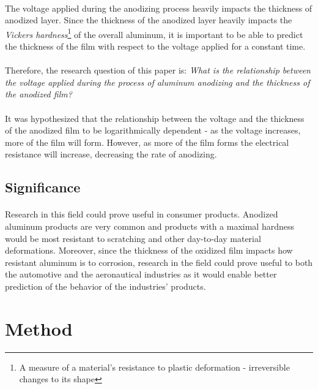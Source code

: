 \documentclass[a4paper]{article}
\begin{document}
\paragraph*{}
The voltage applied during the anodizing process heavily impacts the thickness
of anodized layer. Since the thickness of the anodized layer heavily impacts
the \textit{Vickers hardness}\footnote{A measure of a material's resistance to
plastic deformation - irreversible changes to its shape} of the overall
aluminum, it is important to be able to predict the thickness of the film with
respect to the voltage applied for a constant time.

\paragraph*{}
Therefore, the research question of this paper is: \textit{What is the
  relationship between the voltage applied during the process of aluminum
anodizing and the thickness of the anodized film?}

\paragraph*{}
It was hypothesized that the relationship between the voltage and the thickness
of the anodized film to be logarithmically dependent - as the voltage
increases, more of the film will form. However, as more of the film forms the
electrical resistance will increase, decreasing the rate of anodizing.

\subsection{Significance}

\paragraph*{}
Research in this field could prove useful in consumer products. Anodized
aluminum products are very common and products with a maximal hardness would be
most resistant to scratching and other day-to-day material deformations.
Moreover, since the thickness of the oxidized film impacts how resistant
aluminum is to corrosion, research in the field could prove useful to both the
automotive and the aeronautical industries as it would enable better prediction
of the behavior of the industries' products.

\section{Method}
\end{document}
